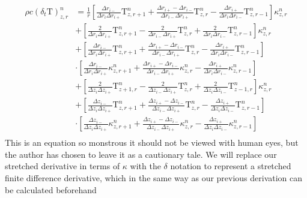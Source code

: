 \documentclass[12pt]{article}
\begin{document}
  \begin{equation}
    \begin{aligned}
      \rho c (\delta_t\mathrm{T})^n_{z, r} &= \frac{1}{r} \left [ \frac{\Delta r_{i-}}{\Delta r_{i} \Delta r_{i+}}\mathrm{T}^n_{z, r+1} + \frac{\Delta r_{i+} - \Delta r_{i-}}{\Delta r_{i-} \Delta r_{i+}}\mathrm{T}^n_{z, r} - \frac{\Delta r_{i+}}{\Delta r_{i} \Delta r_{i-}}\mathrm{T}^n_{z, r-1} \right ] \kappa^n_{z, r} \\
       & + \left [ \frac{2}{\Delta r_{i} \Delta r_{i+}}\mathrm{T}^n_{z, r+1} - \frac{2}{\Delta r_{i-} \Delta r_{i+}}\mathrm{T}^n_{z, r} + \frac{2}{\Delta r_{i} \Delta r_{i-}}\mathrm{T}^n_{z, r-1} \right ] \kappa^n_{z, r} \\
       & +  \left [ \frac{\Delta r_{i-}}{\Delta r_{i} \Delta r_{i+}}\mathrm{T}^n_{z, r+1} + \frac{\Delta r_{i+} - \Delta r_{i-}}{\Delta r_{i-} \Delta r_{i+}}\mathrm{T}^n_{z, r} - \frac{\Delta r_{i+}}{\Delta r_{i} \Delta r_{i-}}\mathrm{T}^n_{z, r-1} \right ] \\
       & \cdot \left [ \frac{\Delta r_{i-}}{\Delta r_{i} \Delta r_{i+}}\kappa^n_{z, r+1} + \frac{\Delta r_{i+} - \Delta r_{i-}}{\Delta r_{i-} \Delta r_{i+}}\kappa^n_{z, r} - \frac{\Delta r_{i+}}{\Delta r_{i} \Delta r_{i-}}\kappa^n_{z, r-1} \right ]   \\
       & + \left [ \frac{2}{\Delta z_{i} \Delta z_{i+}}\mathrm{T}^n_{z+1, r} - \frac{2}{\Delta z_{i-} \Delta z_{i+}}\mathrm{T}^n_{z, r} + \frac{2}{\Delta z_{i} \Delta z_{i-}}\mathrm{T}^n_{z-1, r} \right ] \kappa^n_{z, r} \\
       & +  \left [ \frac{\Delta z_{i-}}{\Delta z_{i} \Delta z_{i+}}\mathrm{T}^n_{z, r+1} + \frac{\Delta z_{i+} - \Delta z_{i-}}{\Delta z_{i-} \Delta z_{i+}}\mathrm{T}^n_{z, r} - \frac{\Delta z_{i+}}{\Delta z_{i} \Delta z_{i-}}\mathrm{T}^n_{z, r-1} \right ] \\
       & \cdot \left [ \frac{\Delta z_{i-}}{\Delta z_{i} \Delta z_{i+}}\kappa^n_{z, r+1} + \frac{\Delta z_{i+} - \Delta z_{i-}}{\Delta z_{i-} \Delta z_{i+}}\kappa^n_{z, r} - \frac{\Delta z_{i+}}{\Delta z_{i} \Delta z_{i-}}\kappa^n_{z, r-1} \right ]   \\
    \end{aligned}
  \end{equation} 
  This is an equation so monstrous it should not be viewed with human eyes, but the author has chosen to leave it as a cautionary tale.
  We will replace our stretched derivative in terms of $\kappa$ with the $\delta$ notation to represent a stretched finite difference derivative, which in the same way as our previous derivation can be calculated beforehand
\end{document}
